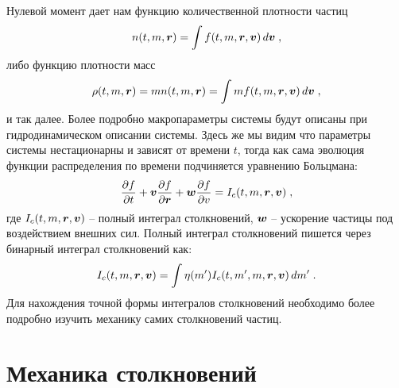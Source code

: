 Нулевой момент дает нам функцию количественной плотности частиц
\begin{equation}
  n(t, m,\bm{r}) = \int f(t, m,\bm{r},\bm{v})\,d\bm{v}\;,
\end{equation}
либо функцию плотности масс
\begin{equation}
  \rho(t, m,\bm{r}) = mn(t, m,\bm{r})=\int mf(t, m,\bm{r},\bm{v})\,d\bm{v}\;,
\end{equation}
и так далее. Более подробно макропараметры системы будут описаны при гидродинамическом описании системы.
Здесь же мы видим что параметры системы нестационарны и зависят от времени $t$, тогда как сама эволюция
функции распределения по времени подчиняется уравнению Больцмана:
\begin{equation}\label{eq:Boltzmann_general}
  \frac{\partial f}{\partial t} + \bm{v}\frac{\partial f}{\partial\bm{r}} + \bm{w}\frac{\partial f}{\partial v} = I_c(t,m,\bm{r},\bm{v})\;,
\end{equation}
где $I_c(t,m,\bm{r},\bm{v})$ -- полный интеграл столкновений, $\bm{w}$ -- ускорение частицы под воздействием внешних сил.
Полный интеграл столкновений пишется через бинарный интеграл столкновений как:
\begin{equation}
  I_c(t,m,\bm{r},\bm{v}) = \int\eta(m')I_c(t,m',m,\bm{r},\bm{v})\,dm'\;.
\end{equation}
Для нахождения точной формы интегралов столкновений необходимо более подробно изучить механику самих столкновений частиц.

\section{Механика столкновений}

